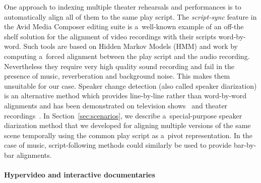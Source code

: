 \documentclass[conference]{IEEEtran}
\begin{document}
One approach to indexing multiple theater rehearsals and performances is to automatically align
all of them to the same play script. The {\em script-sync} feature in the Avid Media Composer editing suite
is a~well-known example of an off-the shelf solution for the alignment of video recordings with their scripts word-by-word. Such tools are based on Hidden Markov Models (HMM) and work by computing  a~forced alignment 
between the play script and the audio recording. Nevertheless they require very high quality 
sound recording and fail in the presence of music, reverberation and background noise. This makes them
unsuitable for our case. Speaker change detection (also called speaker diarization) is an alternative method
which provides line-by-line rather than word-by-word alignments and has been demonstrated 
on television shows~\cite{Sankar09} and theater recordings~\cite{Caillet13}. In Section~\ref{sec:scenarios},
we describe a~special-purpose speaker diarization method that we developed for aligning multiple versions 
of the same scene temporally using the common play script as a~pivot representation. In the case of music,
script-following methods could similarly be used to provide bar-by-bar alignments.


\paragraph*{Hypervideo and interactive documentaries}
\end{document}
